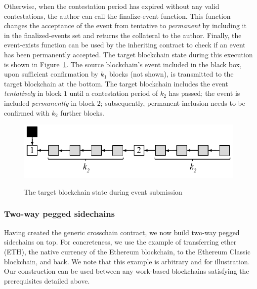 Otherwise, when the contestation period has expired without any valid
contestations, the author can call the \textsf{finalize-event} function. This
function changes the acceptance of the event from tentative to \emph{permanent}
by including it in the \textsf{finalized-events} set and returns the collateral
to the author. Finally, the \textsf{event-exists} function can be used by the
inheriting contract to check if an event has been permanently accepted. The
target blockchain state during this execution is shown in
Figure~\ref{fig.contestation}. The source blockchain's event included in the
black box, upon sufficient confirmation by $k_1$ blocks (not shown), is
transmitted to the target blockchain at the bottom. The target blockchain
includes the event \emph{tentatively} in block $1$ until a contestation period
of $k_2$ has passed; the event is included \emph{permanently} in block $2$;
subsequently, permanent inclusion needs to be confirmed with $k_2$ further
blocks.

\begin{figure}[H]
    \caption{The target blockchain state during event submission}
    \centering
    \includegraphics[width=0.6 \columnwidth,keepaspectratio]{chapters/sidechains/figures/contestation.pdf}
    \label{fig.contestation}
\end{figure}

\subsubsection{Two-way pegged sidechains}
Having created the generic crosschain contract, we now build two-way pegged
sidechains on top. For concreteness, we use the example of transferring ether
(ETH), the native currency of the Ethereum blockchain, to the Ethereum Classic
blockchain, and back. We note that this example is arbitrary and for
illustration. Our construction can be used between any work-based blockchains
satisfying the prerequisites detailed above.

